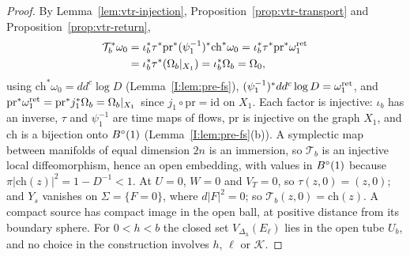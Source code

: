 \begin{proof}
By Lemma~\ref{lem:vtr-injection}, Proposition~\ref{prop:vtr-transport} and Proposition~\ref{prop:vtr-return},
\begin{align*}
 \mathcal T_b^*\omega_0&=\iota_b^*\tau^*\mathrm{pr}^*(\psi_1^{-1})^*\mathrm{ch}^*\omega_0
 =\iota_b^*\tau^*\mathrm{pr}^*\omega^{\rm ret}_1\\
 &=\iota_b^*\tau^*(\Omega_b|_{X_1})=\iota_b^*\Omega_b=\Omega_0 ,
\end{align*}
using $\mathrm{ch}^*\omega_0=dd^c\log D$ (Lemma~\ref{I:lem:pre-fs}), $(\psi_1^{-1})^*dd^c\log D=\omega^{\rm ret}_1$, and
$\mathrm{pr}^*\omega^{\rm ret}_1=\mathrm{pr}^*j_1^*\Omega_b=\Omega_b|_{X_1}$ since $j_1\circ\mathrm{pr}=\mathrm{id}$ on $X_1$. Each
factor is injective: $\iota_b$ has an inverse, $\tau$ and $\psi_1^{-1}$ are time maps of flows, $\mathrm{pr}$ is injective on the
graph $X_1$, and $\mathrm{ch}$ is a bijection onto $B^{\circ}(1)$ (Lemma~\ref{I:lem:pre-fs}(b)). A symplectic map between manifolds of
equal dimension $2n$ is an immersion, so $\mathcal T_b$ is an injective local diffeomorphism, hence an open embedding, with values
in $B^{\circ}(1)$ because $\pi|\mathrm{ch}(z)|^2=1-D^{-1}<1$. At $U=0$, $W=0$ and $V_T=0$, so $\tau(z,0)=(z,0)$; and $Y_s$ vanishes on
$\Sigma=\{F=0\}$, where $d|F|^2=0$; so $\mathcal T_b(z,0)=\mathrm{ch}(z)$. A compact source has compact image in the open ball, at
positive distance from its boundary sphere. For $0<h<b$ the closed set $V_{\Delta_h}(E_\ell)$ lies in the open tube $U_b$, and no
choice in the construction involves $h$, $\ell$ or $\mathcal K$.
\end{proof}
